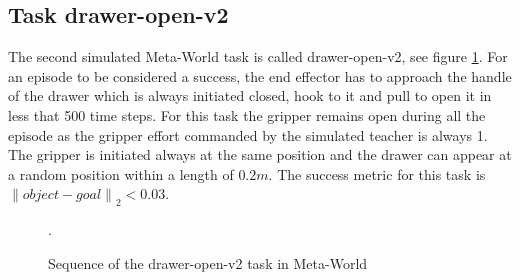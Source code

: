 \subsection{Task drawer-open-v2}
\label{subsection:metaworld-open-drawer-task}
The second simulated Meta-World task is called drawer-open-v2, see figure \ref{fig:sequence-drawer}. For an episode to be considered a success, the end effector has to approach the handle of the drawer which is always initiated closed, hook to it and pull to open it in less that 500 time steps.
For this task the gripper remains open during all the episode as the gripper effort commanded by the simulated teacher is always 1. The gripper is initiated always at the same position and the drawer can appear at a random position within a length of $0.2m$. The success metric for this task is ${\left\lVert object-goal \right\rVert}_2 < 0.03$.
 




 \begin{figure}[H]
  \centering
  \hspace*{\fill}%
   \hfill
   \hfill
  \hspace*{\fill}%
  \caption{Sequence of the drawer-open-v2 task in Meta-World}.
  \label{fig:sequence-drawer}
\end{figure}






